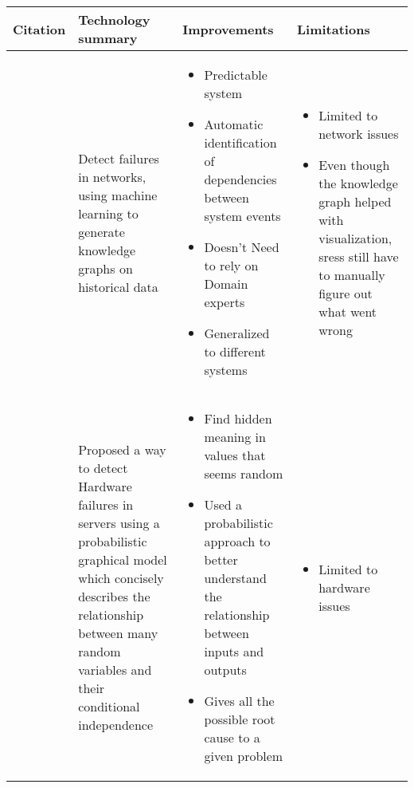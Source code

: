 \begin{longtable}{| p{20mm} | p{40mm} | p{43mm} | p{46mm} |}
\hline
  \textbf{Citation} &
  \textbf{Technology summary} &
  \textbf{Improvements} &
  \textbf{Limitations} \\ \hline
  \cite{gonzalez2017root} &
  Detect failures in networks, using machine learning to generate knowledge graphs on historical data &
  \vspace{-8mm}
  \begin{itemize}[leftmargin=*,noitemsep,nolistsep] 
    \item Predictable system
    \item Automatic identification of dependencies between system events
    \item Doesn't Need to rely on Domain experts
    \item Generalized to different systems
  \vspace{-7mm}
  \end{itemize} &
  \vspace{-8mm}
  \begin{itemize}[leftmargin=*,noitemsep,nolistsep] 
    \item Limited to network issues
    \item Even though the knowledge graph helped with visualization, \acp{sres} still have to manually figure out what went wrong
  \vspace{-7mm}
  \end{itemize} \\ \hline
  \cite{chigurupati2017root} &
  Proposed a way to detect Hardware failures in servers using a probabilistic graphical model which concisely describes the relationship between many random variables and their conditional independence &
  \vspace{-8mm}
  \begin{itemize}[leftmargin=*,noitemsep,nolistsep] 
    \item Find hidden meaning in values that seems random
    \item Used a probabilistic approach to better understand the relationship between inputs and outputs
    \item Gives all the possible root cause to a given problem
  \vspace{-7mm}
  \end{itemize} &
  \vspace{-8mm}
  \begin{itemize}[leftmargin=*,noitemsep,nolistsep] 
    \item Limited to hardware issues

\end{itemize}
\end{longtable}

